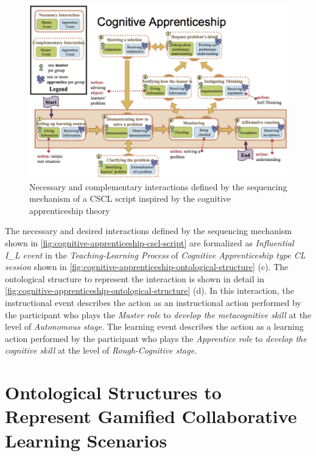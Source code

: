 \begin{figure}[!htbp]
 \caption{Necessary and complementary interactions defined by the sequencing mechanism of a CSCL script inspired by the cognitive apprenticeship theory}
 \label{fig:cognitive-apprenticeship-cscl-script}
 \centering
 \includegraphics[width=1\textwidth]{images/chap-ontogacles1/cognitive-apprenticeship-cscl-script.png}
\end{figure}

The necessary and desired interactions defined by the sequencing mechanism shown in \autoref{fig:cognitive-apprenticeship-cscl-script} are formalized as \emph{Influential I\_L event} in the \emph{Teaching-Learning Process} of \emph{Cognitive Apprenticeship type CL session} shown in \autoref{fig:cognitive-apprenticeship-ontological-structure} (c). The ontological structure to represent the interaction  is shown in detail in \autoref{fig:cognitive-apprenticeship-ontological-structure} (d). In this interaction, the instructional event  describes the action  as an instructional action performed by the participant who plays the \emph{Master role} to \emph{develop the metacognitive skill} at the level of \emph{Autonomous stage}. The learning event  describes the action  as a learning action performed by the participant who plays the \emph{Apprentice role} to \emph{develop the cognitive skill} at the level of \emph{Rough-Cognitive stage}.



\section[Ontological Structures to Represent Gamified CL Scenarios]{Ontological Structures to Represent Gamified Collaborative Learning Scenarios}
\label{sec:modeling-gamified-cl-scenarios}

